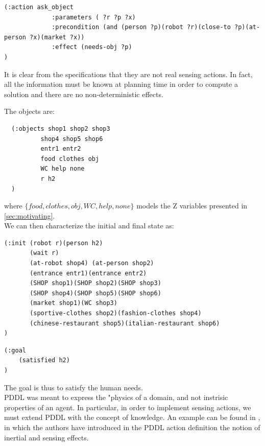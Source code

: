 \documentclass[pdftex,12pt,a4paper]{report}
\begin{document}
\begin{verbatim}
(:action ask_object 
             :parameters ( ?r ?p ?x)
             :precondition (and (person ?p)(robot ?r)(close-to ?p)(at-person ?x)(market ?x))
             :effect (needs-obj ?p)
)
\end{verbatim}

\noindent It is clear from the specifications that they are not real sensing actions. In fact, all the information must be known at planning time in order to compute a solution and there are no non-deterministic effects.

The objects are:
\begin{verbatim}
  (:objects shop1 shop2 shop3
          shop4 shop5 shop6
          entr1 entr2
          food clothes obj
          WC help none
          r h2
  )
\end{verbatim}
\noindent where $\{food, clothes, obj, WC, help, none\}$ models the Z variables presented in \ref{sec:motivating}.\\
\noindent We can then characterize the initial and final state as:
\begin{verbatim}
(:init (robot r)(person h2)
       (wait r)
	   (at-robot shop4) (at-person shop2)
       (entrance entr1)(entrance entr2)
       (SHOP shop1)(SHOP shop2)(SHOP shop3)
       (SHOP shop4)(SHOP shop5)(SHOP shop6)
       (market shop1)(WC shop3)
       (sportive-clothes shop2)(fashion-clothes shop4)
       (chinese-restaurant shop5)(italian-restaurant shop6)
)
\end{verbatim}

\begin{verbatim}
(:goal
    (satisfied h2)
)
\end{verbatim}
\noindent The goal is thus to satisfy the human needs. \\
\noindent PDDL was meant to express the "physics of a domain, and not instrisic properties of an agent.
In particular, in order to implement sensing actions, we must extend PDDL with the concept of knowledge. An example can be found in \cite{iocchi2003},%
in which the authors have introduced in the PDDL action definition the notion of inertial and sensing effects.
\end{document}
